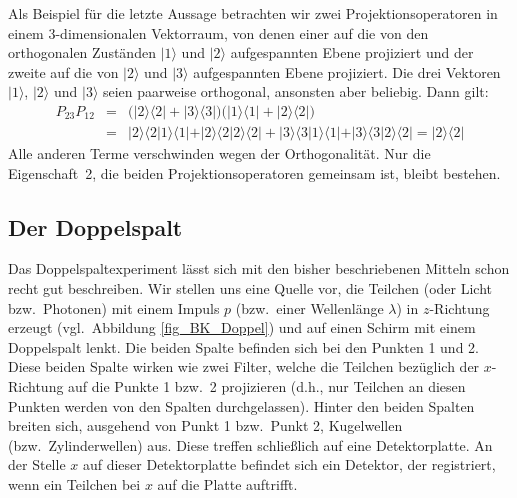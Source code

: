 Als Beispiel f\"ur die letzte Aussage betrachten wir zwei Projektionsoperatoren in einem 
3-dimensionalen Vektorraum, von denen einer auf die von den orthogonalen Zust\"anden
$|1\rangle$ und $|2\rangle$ aufgespannten Ebene projiziert und der zweite auf die
von $|2\rangle$ und $|3\rangle$ aufgespannten Ebene projiziert. Die drei Vektoren
$|1\rangle$, $|2\rangle$ und $|3\rangle$ seien paarweise orthogonal, ansonsten aber beliebig.
Dann gilt:
\begin{eqnarray}
       P_{23} P_{12} &=& \Big( |2\rangle \langle 2| + |3\rangle \langle 3| \Big) \Big( |1\rangle \langle 1| + |2\rangle \langle 2| \Big) \\
           &=& |2\rangle \langle 2|1\rangle \langle 1| + |2\rangle \langle 2|2\rangle \langle 2| +
           |3\rangle \langle 3|1\rangle \langle 1| + |3\rangle \langle 3|2\rangle \langle 2| 
           = |2\rangle \langle 2|
\end{eqnarray}
Alle anderen Terme verschwinden wegen der Orthogonalit\"at. Nur die \glqq Eigenschaft\grqq\ 2, die beiden
Projektionsoperatoren gemeinsam ist, bleibt bestehen. 

\subsection{Der Doppelspalt}

Das Doppelspaltexperiment 
l\"asst sich mit den bisher beschriebenen Mitteln schon recht gut
beschreiben. Wir stellen uns eine Quelle vor, die Teilchen (oder Licht bzw.\ Photonen) mit einem
Impuls $p$ (bzw.\ einer Wellenl\"ange $\lambda$) in $z$-Richtung erzeugt (vgl.\ Abbildung \ref{fig_BK_Doppel})
und auf einen Schirm mit einem Doppelspalt lenkt. Die beiden Spalte befinden sich bei den Punkten 1
und 2. Diese beiden Spalte wirken wie zwei Filter, welche die Teilchen bez\"uglich der $x$-Richtung
auf die Punkte 1 bzw.\ 2 projizieren (d.h., nur Teilchen an diesen Punkten werden von den Spalten
durchgelassen). Hinter den beiden Spalten breiten sich, ausgehend von Punkt 1 bzw.\ Punkt 2, 
Kugelwellen (bzw.\ Zylinderwellen) aus. Diese treffen schlie\ss lich auf eine Detektorplatte. An der
Stelle $x$ auf dieser Detektorplatte befindet sich ein Detektor, der registriert, wenn ein Teilchen bei $x$
auf die Platte auftrifft. 

